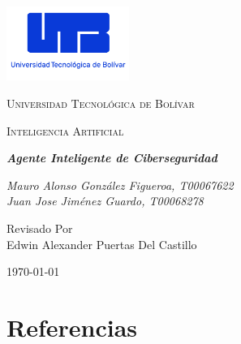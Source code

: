 \documentclass[letterpaper, 12pt]{article}
\begin{document}
\begin{titlepage}
      \centering
      \includegraphics[width=0.3\textwidth]{../../../images/logo_utb.png}
      \par\vspace{.5cm}

      {\scshape\LARGE Universidad Tecnológica de Bolívar \par}
      \vspace{1cm}

      {\scshape\Large Inteligencia Artificial \par}
      \vspace{1.5cm}

      \slshape {\Large \bfseries{}Agente Inteligente de Ciberseguridad\\}
      \vspace{2.5cm}

      \slshape {\itshape{} Mauro Alonso González Figueroa, T00067622 \\}
      \slshape {\itshape{} Juan Jose Jiménez Guardo, T00068278 \\}

      \vfill
      Revisado Por \\
      Edwin Alexander Puertas Del Castillo\\
      {\large \today\par}
\end{titlepage}

\tableofcontents{}
\newpage






\newpage
\section*{Referencias}
\renewcommand{\refname}{}
\renewcommand{\bibname}{}
\vspace{-1.5cm}
\printbibliography{}

\newpage

\end{document}
